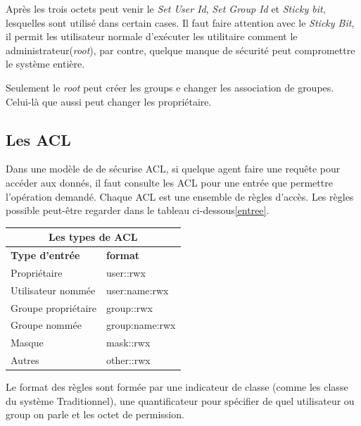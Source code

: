 Après les trois octets peut venir le \emph{Set User Id}, \emph{Set Group Id} et \emph{Sticky bit}, lesquelles sont utilisé dans certain cases. Il faut faire attention avec le \emph{Sticky Bit}, il permit les utilisateur normale d'exécuter les utilitaire comment le administrateur(\emph{root}), par contre, quelque manque de sécurité peut compromettre le système entière.

Seulement le \emph{root} peut créer les groups e changer les association de groupes. Celui-là que aussi peut changer les propriétaire. 

\subsection*{Les ACL}

Dans une modèle de de sécurise ACL, si quelque agent faire une requête pour accéder aux donnés, il faut consulte les ACL pour une entrée que permettre l'opération demandé. Chaque ACL est une ensemble de règles d'accès. Les règles possible peut-être regarder dans le tableau ci-dessous\ref{entree}.
\begin{center}
\begin{tabular}{|l|l|}
  \hline
    \multicolumn{2}{|c|}{Les types de ACL} \\
  \hline
	\textbf{Type d'entrée} & \textbf{format} \\
  \hline
	Propriétaire & user::rwx \\
	Utilisateur nommée & user:name:rwx  \\
	Groupe propriétaire & group::rwx \\
	Groupe nommée & group:name:rwx \\
	Masque & mask::rwx \\
	Autres & other::rwx \\   
  \hline
\end{tabular}
\label{tab:entree}
\end{center}

Le format des règles sont formée par une indicateur de classe (comme les classe du système Traditionnel), une quantificateur pour spécifier de quel utilisateur ou group on parle et les octet de permission.

